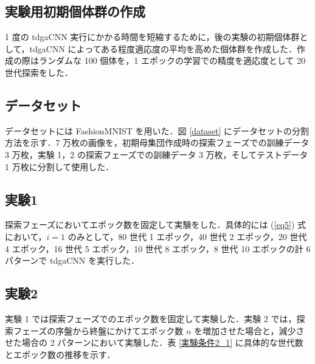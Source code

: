 \documentclass[twocolumn]{jarticle}     %
\begin{document}
\subsection{実験用初期個体群の作成}
1 度の tdgaCNN 実行にかかる時間を短縮するために，後の実験の初期個体群として，tdgaCNN によってある程度適応度の平均を高めた個体群を作成した．作成の際はランダムな 100 個体を，1 エポックの学習での精度を適応度として 20 世代探索をした．　\par

\subsection{データセット}
データセットには FashionMNIST を用いた．図 \ref{dataset} にデータセットの分割方法を示す．7 万枚の画像を，初期母集団作成時の探索フェーズでの訓練データ 3 万枚，実験 1，2 の探索フェーズでの訓練データ 3 万枚，そしてテストデータ 1 万枚に分割して使用した．

\subsection{実験1}
探索フェーズにおいてエポック数を固定して実験をした．具体的には (\ref{eq5}) 式において，$i = 1$ のみとして，80 世代 1 エポック，40 世代 2 エポック，20 世代 4 エポック，16 世代 5 エポック，10 世代 8 エポック，8 世代 10 エポックの計 6 パターンで tdgaCNN を実行した．

\subsection{実験2}
実験 1 では探索フェーズでのエポック数を固定して実験した．実験 2 では，探索フェーズの序盤から終盤にかけてエポック数 $n$ を増加させた場合と，減少させた場合の 2 パターンにおいて実験した．表 \ref{実験条件2_1} に具体的な世代数とエポック数の推移を示す．
\end{document}
